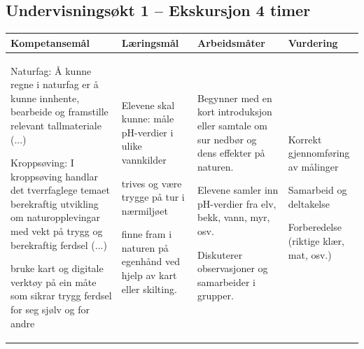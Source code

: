\documentclass[a4paper,12pt]{article}
\begin{document}




\begin{landscape}

\subsection*{Undervisningsøkt 1 – Ekskursjon 4 timer}

\begin{tabular}{|p{5cm}|p{6cm}|p{8cm}|p{6cm}|}
\hline
\textbf{Kompetansemål} & \textbf{Læringsmål} & \textbf{Arbeidsmåter} & \textbf{Vurdering} \\
\hline
Naturfag: Å kunne regne i naturfag er å kunne innhente, bearbeide og framstille relevant tallmateriale (...)\newline

Kroppsøving: I kroppsøving handlar det tverrfaglege temaet berekraftig utvikling om naturopplevingar med vekt på trygg og berekraftig ferdsel (...)\newline

bruke kart og digitale verktøy på ein måte som sikrar trygg ferdsel for seg sjølv og for andre\newline


& 
Elevene skal kunne: måle pH-verdier i ulike vannkilder\newline

trives og være trygge på tur i nærmiljøet\newline

finne fram i naturen på egenhånd ved hjelp av kart eller skilting.
& 
Begynner med en kort introduksjon eller samtale om sur nedbør og dens effekter på naturen.\newline

Elevene samler inn pH-verdier fra elv, bekk, vann, myr, osv.\newline

Diskuterer observasjoner og samarbeider i grupper.
& 
Korrekt gjennomføring av målinger\newline

Samarbeid og deltakelse\newline

Forberedelse (riktige klær, mat, osv.)
\\
\hline
\end{tabular}


\end{landscape}
\end{document}

